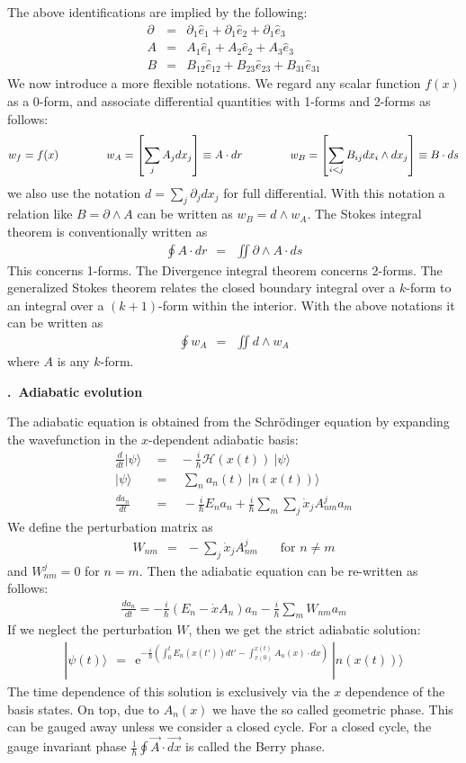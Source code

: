 \documentclass[onecolumn,fleqn, 11pt]{revtex4}
\newcommand{\eexp}{\mathrm{e}^}
\newcommand{\beq}{\begin{eqnarray}}
\newcommand{\eeq}{\end{eqnarray}}
\renewcommand{\thesubsection}{\arabic{subsection}}
\renewcommand{\thesubsubsection}{\arabic{subsubsection}}
\newcommand{\sheadC}[1]
{
\addtocounter{subsubsection}{1}
\vspace{5mm}
{\bf \thesubsection.\thesubsubsection \ #1}  
\nopagebreak
\phantomsection
}
\begin{document}
The above identifications are implied by the following:
\beq
\partial &=& \partial_1\hat{e}_1+\partial_1\hat{e}_2+\partial_1\hat{e}_3
\\ \nonumber
A &=& A_1\hat{e}_1+A_2\hat{e}_2+A_3\hat{e}_3 
\\ \nonumber
B &=& B_{12} \hat{e}_{12}+B_{23} \hat{e}_{23}+B_{31} \hat{e}_{31}
\eeq
We now introduce a more flexible notations. We regard any scalar function $f(x)$ as a 0-form, 
and associate differential quantities with 1-forms and 2-forms as follows:
\beq 
w_f = f(x)
\hspace{15mm}
w_A = \left[\sum_j A_j dx_j\right] \equiv A \cdot dr
\hspace{15mm}     
w_B = \left[\sum_{i<j} B_{ij} dx_i \wedge dx_j\right] \equiv B \cdot ds
\eeq
we also use the notation $d= \sum_j \partial_j dx_j$ for full differential.
With this notation a relation like ${B=\partial \wedge A}$ 
can be written as  ${w_B=d \wedge w_A}$.
The Stokes integral theorem is conventionally written as 
\beq
\oint A \cdot dr \ \ = \ \ \iint\partial\wedge A\cdot ds
\eeq
This concerns 1-forms. 
The Divergence integral theorem concerns 2-forms.  
The generalized Stokes theorem relates the closed 
boundary integral over a $k$-form to an integral 
over a $(k{+}1)$-form within the interior. 
With the above notations it can be written as 
\beq
\oint w_A \ \ = \ \ \iint d \wedge w_A
\eeq
where $A$ is any $k$-form.


\sheadC{Adiabatic evolution}

The adiabatic equation is obtained from the
Schr\"{o}dinger equation by expanding the wavefunction
in the $x$-dependent adiabatic basis:
\beq
\frac{d}{dt}|\psi\rangle \ \ &=&
\  -\frac{i}{\hbar} {\mathcal{H}}(x(t)) \ |\psi\rangle
\\ \nonumber
|\psi\rangle \ \ &=& \ \ \sum_n a_n(t) \ |n(x(t))\rangle
\\ \nonumber
\frac{da_n}{dt} \ \ &=& \ \ -\frac{i}{\hbar} E_n a_n
+\frac{i}{\hbar} \sum_m \sum_j
\dot{x}_j A^{j}_{nm} a_m 
\eeq
We define the perturbation matrix as
\beq
W_{nm} \ \ = \ \ -\sum_j\dot{x}_j A^j_{nm}
\ \ \ \ \ \ \ \ \mbox{for $n\ne m$}
\eeq
and $W^{j}_{nm}=0$ for $n=m$.
Then the adiabatic equation can be re-written
as follows:
\beq
\frac{da_n}{dt} = -\frac{i}{\hbar} (E_n - \dot{x} A_n) a_n
-\frac{i}{\hbar} \sum_m
W_{nm} a_m
\eeq
If we neglect the perturbation $W$,
then we get the strict adiabatic solution:
\beq
| \psi(t) \rangle \ \ = \ \ 
\eexp{
-\frac{i}{\hbar} \left(
\int_0^t E_n(x(t'))dt'
-\int_{x(0)}^{x(t)} A_n(x)\cdot dx
\right)
}
\ |n(x(t))\rangle
\eeq
The time dependence of this solution is 
exclusively via the $x$ dependence of the  
basis states. On top, due to $A_n(x)$ we have 
the so called geometric phase.
This can be gauged away unless we consider a closed
cycle. For a closed cycle, the gauge invariant
phase $\frac{1}{\hbar} \oint \vec{A}\cdot \vec{dx}$ 
is called the Berry phase.
\end{document}
